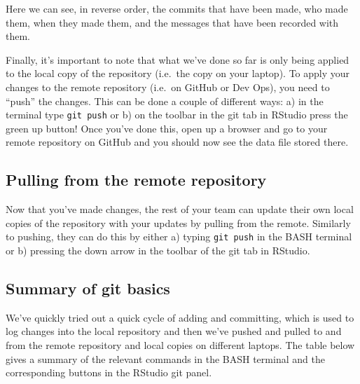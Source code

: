 \documentclass[
  12pt,
]{article}
\begin{document}
Here we can see, in reverse order, the commits that have been made, who
made them, when they made them, and the messages that have been recorded
with them.

Finally, it's important to note that what we've done so far is only
being applied to the local copy of the repository (i.e.~the copy on your
laptop). To apply your changes to the remote repository (i.e.~on GitHub
or Dev Ops), you need to ``push'' the changes. This can be done a couple
of different ways: a) in the terminal type \texttt{git\ push} or b) on
the toolbar in the git tab in RStudio press the green up button! Once
you've done this, open up a browser and go to your remote repository on
GitHub and you should now see the data file stored there.

\hypertarget{pulling-from-the-remote-repository}{%
\subsection{Pulling from the remote
repository}\label{pulling-from-the-remote-repository}}

Now that you've made changes, the rest of your team can update their own
local copies of the repository with your updates by pulling from the
remote. Similarly to pushing, they can do this by either a) typing
\texttt{git\ push} in the BASH terminal or b) pressing the down arrow in
the toolbar of the git tab in RStudio.

\hypertarget{summary-of-git-basics}{%
\subsection{Summary of git basics}\label{summary-of-git-basics}}

We've quickly tried out a quick cycle of adding and committing, which is
used to log changes into the local repository and then we've pushed and
pulled to and from the remote repository and local copies on different
laptops. The table below gives a summary of the relevant commands in the
BASH terminal and the corresponding buttons in the RStudio git panel.
\end{document}
